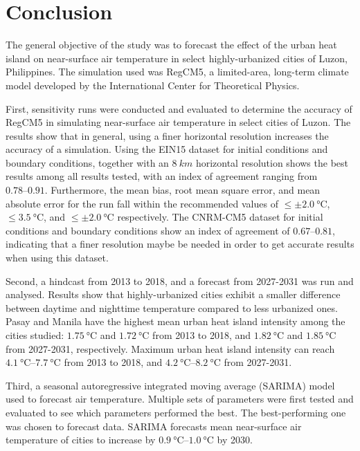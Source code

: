 \section{Conclusion}
	The general objective of the study was to forecast the effect of the urban heat island on near-surface air temperature in select highly-urbanized cities of Luzon, Philippines.
	The simulation used was RegCM5, a limited-area, long-term climate model developed by the International Center for Theoretical Physics.
	
	First, sensitivity runs were conducted and evaluated to determine the accuracy of RegCM5 in simulating near-surface air temperature in select cities of Luzon.
	The results show that in general, using a finer horizontal resolution increases the accuracy of a simulation.
	Using the EIN15 dataset for initial conditions and boundary conditions, together with an $\qty{8}{km}$ horizontal resolution shows the best results among all results tested, with an index of agreement ranging from $\numrange{0.78}{0.91}$.
	Furthermore, the mean bias, root mean square error, and mean absolute error for the run fall within the recommended values of $\leq \pm \qty{2.0}{\degreeCelsius}$, $\leq \qty{3.5}{\degreeCelsius}$, and $\leq \pm \qty{2.0}{\degreeCelsius}$ respectively.
	The CNRM-CM5 dataset for initial conditions and boundary conditions show an index of agreement of $\numrange{0.67}{0.81}$, indicating that a finer resolution maybe be needed in order to get accurate results when using this dataset.
	
	Second, a hindcast from 2013 to 2018, and a forecast from 2027-2031 was run and analysed.
	Results show that highly-urbanized cities exhibit a smaller difference between daytime and nighttime temperature compared to less urbanized ones.
	Pasay and Manila have the highest mean urban heat island intensity among the cities studied: 
		$\qty{1.75}{\degreeCelsius}$ and $\qty{1.72}{\degreeCelsius}$ from 2013 to 2018,
		and
		$\qty{1.82}{\degreeCelsius}$ and $\qty{1.85}{\degreeCelsius}$ from 2027-2031, respectively.
	Maximum urban heat island intensity can reach 
		$\qtyrange{4.1}{7.7}{\degreeCelsius}$ from 2013 to 2018,
		and
		$\qtyrange{4.2}{8.2}{\degreeCelsius}$ from 2027-2031.
	
	Third, a seasonal autoregressive integrated moving average (SARIMA) model used to forecast air temperature.
	Multiple sets of parameters were first tested and evaluated to see which parameters performed the best.
	The best-performing one was chosen to forecast data.
	SARIMA forecasts mean near-surface air temperature of cities to increase by $\qtyrange{0.9}{1.0}{\degreeCelsius}$ by 2030.

